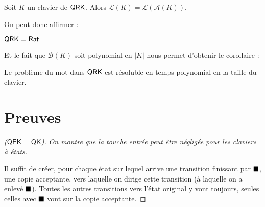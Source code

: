 \documentclass[12pt, a4paper]{article}
\renewcommand{\L}{\mathcal{L}}
\newcommand{\A}{\mathcal{A}}
\begin{document}
    \begin{bisimautomclav}\label{lklak}
        Soit $K$ un clavier de $\mathsf{QRK}$. Alors $\L(K) = \L(\A(K))$.
    \end{bisimautomclav}
    On peut donc affirmer :
    \begin{QRKegalRat}
        $\mathsf{QRK} = \mathsf{Rat}$
    \end{QRKegalRat}
    Et le fait que $\mathcal{B}(K)$ soit polynomial en $|K|$ nous permet d'obtenir le corollaire :
    \begin{motQRK}
        Le problème du mot dans $\mathsf{QRK}$ est résoluble en temps polynomial en la taille du clavier.
    \end{motQRK}
    
    \clearpage


    \appendix
    \section{Preuves}
    \begin{proof}[($\mathsf{QEK} = \mathsf{QK}$)]
        \emph{On montre que la touche entrée peut être négligée pour les claviers à états.} 

        Il suffit de créer, pour chaque état sur lequel arrive une transition finissant par $\mathord{\blacksquare}$, une copie acceptante, vers laquelle on dirige cette transition (à laquelle on a enlevé $\mathord{\blacksquare}$).
        Toutes les autres transitions vers l'état original y vont toujours, seules celles avec $\mathord{\blacksquare}$ vont sur la copie acceptante. \medskip

    \end{proof}
\end{document}
